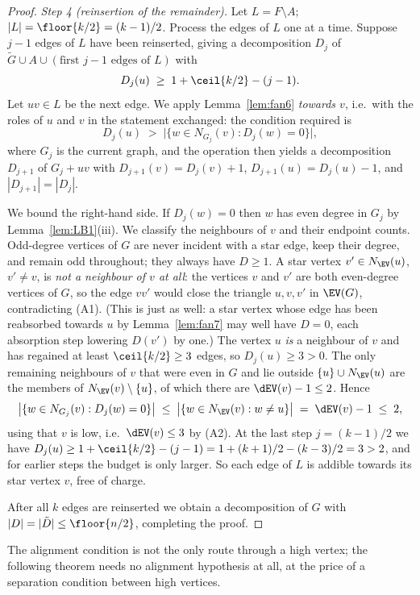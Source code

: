 \begin{proof}
\emph{Step 4 (reinsertion of the remainder).}
Let $L=F\setminus A$; $|L|=\floor{k/2}=(k-1)/2$. Process the edges of $L$ one at a time.
Suppose $j-1$ edges of $L$ have been reinserted, giving a decomposition $D_j$ of
$\tilde G\cup A\cup(\text{first } j-1 \text{ edges of } L)$ with
\[
D_j(u)\;\ge\;1+\ceil{k/2}-(j-1).
\]
Let $uv\in L$ be the next edge. We apply Lemma~\ref{lem:fan6} \emph{towards $v$}, i.e.\ with
the roles of $u$ and $v$ in the statement exchanged: the condition required is
\[
D_j(u)\;>\;\bigl|\{w\in N_{G_j}(v) : D_j(w)=0\}\bigr|,
\]
where $G_j$ is the current graph, and the operation then yields a decomposition $D_{j+1}$ of
$G_j+uv$ with $D_{j+1}(v)=D_j(v)+1$, $D_{j+1}(u)=D_j(u)-1$, and $|D_{j+1}|=|D_j|$.

We bound the right-hand side. If $D_j(w)=0$ then $w$ has even degree in $G_j$ by
Lemma~\ref{lem:LB1}(iii). We classify the neighbours of $v$ and their endpoint counts.
Odd-degree vertices of $G$ are never incident with a star edge, keep their degree, and
remain odd throughout; they always have $D\ge1$. A star vertex $v'\in N_{\EV}(u)$,
$v'\ne v$, is \emph{not a neighbour of $v$ at all}: the vertices $v$ and $v'$ are both
even-degree vertices of $G$, so the edge $vv'$ would close the triangle $u,v,v'$ in
$\EV(G)$, contradicting (A1). (This is just as well: a star vertex whose edge has been
reabsorbed towards $u$ by Lemma~\ref{lem:fan7} may well have $D=0$, each absorption step
lowering $D(v')$ by one.) The vertex $u$ \emph{is} a neighbour of $v$ and has
regained at least $\ceil{k/2}\ge3$ edges, so $D_j(u)\ge3>0$. The only remaining
neighbours of $v$ that were even in $G$ and lie outside $\{u\}\cup N_{\EV}(u)$ are the
members of $N_{\EV}(v)\setminus\{u\}$, of which there are $\dEV(v)-1\le2$. Hence
\[
\bigl|\{w\in N_{G_j}(v) : D_j(w)=0\}\bigr|
\;\le\; \bigl|\{w\in N_{\EV}(v) : w\ne u\}\bigr|
\;=\;\dEV(v)-1\;\le\;2,
\]
using that $v$ is low, i.e.\ $\dEV(v)\le 3$ by (A2). At the last
step $j=(k-1)/2$ we have
$D_j(u)\ge 1+\ceil{k/2}-(j-1)=1+(k+1)/2-(k-3)/2=3>2$, and for earlier steps the budget is only
larger. So each edge of $L$ is addible towards its star vertex $v$, free of charge.

After all $k$ edges are reinserted we obtain a decomposition of $G$ with
$|D|=|\tilde D|\le\floor{n/2}$, completing the proof.
\end{proof}

The alignment condition is not the only route through a high vertex; the following theorem
needs no alignment hypothesis at all, at the price of a separation condition between high
vertices.

